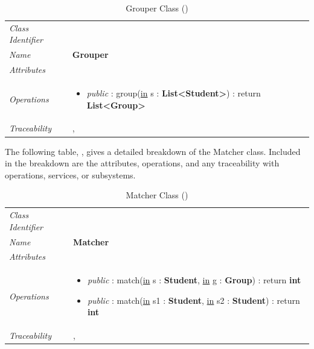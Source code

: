 \documentclass[12pt,letterpaper]{article}
\begin{document}
\begin{table}[H]
    \caption{Grouper Class ()} 
	\begin{tabu} to 
		\toprule
		Class Identifier &  \\
		Name & {\bf Grouper} \\
		Attributes & \\

		Operations &
		\begin{minipage}[t]{\linewidth}
			\begin{itemize}
			    \item {\it public} : group(\underline{in} s : {\bf List<Student>}) : return {\bf List<Group>}
	        \end{itemize}
	    \end{minipage} \\
	    	Traceability & , \\
		\toprule
	\end{tabu}
\end{table}

The following table, , gives a detailed breakdown of the Matcher class. Included in the breakdown are the attributes, operations, and any traceability with operations, services, or subsystems.

\begin{table}[H]
    \caption{Matcher Class ()} 
	\begin{tabu} to 
		\toprule
		Class Identifier &  \\
		Name & {\bf Matcher} \\
		Attributes & \\

		Operations &
		\begin{minipage}[t]{\linewidth}
			\begin{itemize}
			    \item {\it public} : match(\underline{in} s : {\bf Student}, \underline{in} g : {\bf Group}) : return {\bf int}
			    \item {\it public} : match(\underline{in} s1 : {\bf Student}, \underline{in} s2 : {\bf Student}) : return {\bf int}
	        \end{itemize}
	    \end{minipage} \\
	    	Traceability & , \\
		\toprule
	\end{tabu}
\end{table}
\end{document}

